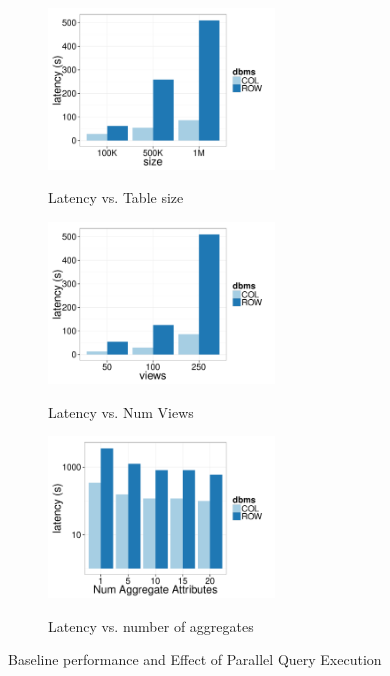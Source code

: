 \begin{figure}[t]
	\centering
	\begin{subfigure}{0.33\linewidth}
		{\includegraphics[width=6cm] {Images/baselines_by_size.pdf}}
		\caption{Latency vs. Table size}
		\label{fig:baseline_size}
	\end{subfigure}
	\begin{subfigure}{0.33\linewidth}
		\centering
		{\includegraphics[width=6cm] {Images/baselines_by_views.pdf}}
		\caption{Latency vs. Num Views}
		\label{fig:baseline_views}
	\end{subfigure}
	\begin{subfigure}{0.33\linewidth}
		{\includegraphics[width=6cm] {Images/multi_agg.pdf}}
		\caption{Latency vs. number of aggregates}
		\label{fig:multi_agg}
	\end{subfigure}
	\caption{Baseline performance and Effect of Parallel Query Execution }
	\label{fig:bank_perf}
\end{figure}

